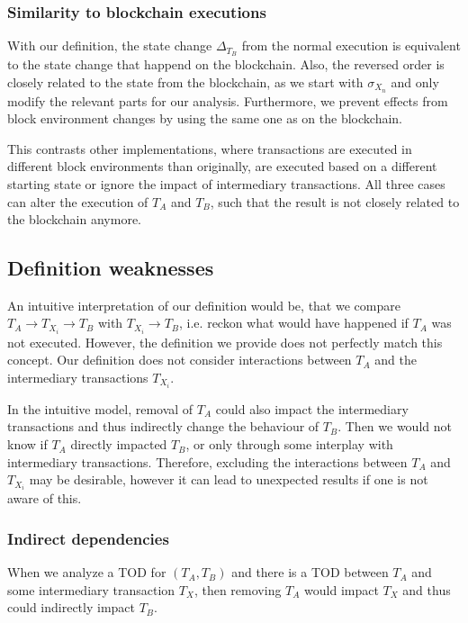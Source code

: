 \documentclass[draft,final]{vutinfth} %
\begin{document}
\subsubsection{Similarity to blockchain executions}

With our definition, the state change $\Delta_{T_B}$ from the normal execution is equivalent to the state change that happend on the blockchain. Also, the reversed order is closely related to the state from the blockchain, as we start with $\sigma_{X_n}$ and only modify the relevant parts for our analysis. Furthermore, we prevent effects from block environment changes by using the same one as on the blockchain.

This contrasts other implementations, where transactions are executed in different block environments than originally, are executed based on a different starting state or ignore the impact of intermediary transactions. All three cases can alter the execution of $T_A$ and $T_B$, such that the result is not closely related to the blockchain anymore.

\subsection{Definition weaknesses}
\label{sec:weaknesses}

An intuitive interpretation of our definition would be, that we compare $T_A \rightarrow T_{X_i} \rightarrow T_B$ with $T_{X_i} \rightarrow T_B$, i.e. reckon what would have happened if $T_A$ was not executed. However, the definition we provide does not perfectly match this concept. Our definition does not consider interactions between $T_A$ and the intermediary transactions $T_{X_i}$.

In the intuitive model, removal of $T_A$ could also impact the intermediary transactions and thus indirectly change the behaviour of $T_B$. Then we would not know if $T_A$ directly impacted $T_B$, or only through some interplay with intermediary transactions. Therefore, excluding the interactions between $T_A$ and $T_{X_i}$ may be desirable, however it can lead to unexpected results if one is not aware of this.

\subsubsection{Indirect dependencies}

When we analyze a TOD for $(T_A, T_B)$ and there is a TOD between $T_A$ and some intermediary transaction $T_X$, then removing $T_A$ would impact $T_X$ and thus could indirectly impact $T_B$.
\end{document}
